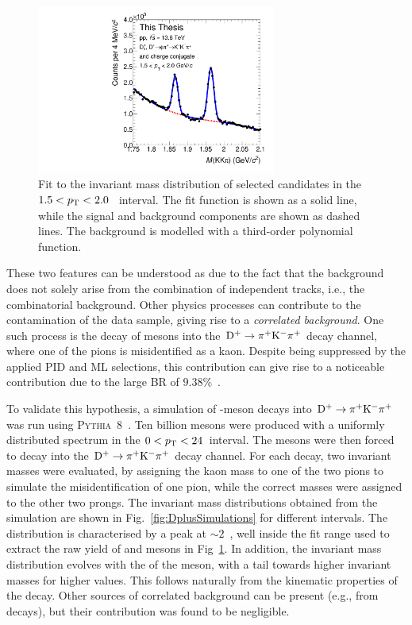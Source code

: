 \begin{figure}[htb]
    \centering
    \includegraphics[width=0.7\textwidth]{Figures/Chapter 5/InvMassFitDs1p5_2.pdf}
    \caption{Fit to the invariant mass distribution of selected candidates in the \mbox{$1.5<p_\mathrm{T}<2.0$~\gevc} interval. The fit function is shown as a solid line, while the signal and background components are shown as dashed lines. The background is modelled with a third-order polynomial function.}
    \label{fig:old_fit}
\end{figure}

These two features can be understood as due to the fact that the background does not solely arise from the combination of independent tracks, i.e., the combinatorial background. Other physics processes can contribute to the contamination of the data sample, giving rise to a \emph{correlated background}. One such process is the decay of \dpl mesons into the $\mathrm{D^+}\rightarrow\mathrm{\pi^+K^-\pi^+}$ decay channel, where one of the pions is misidentified as a kaon. Despite being suppressed by the applied PID and ML selections, this contribution can give rise to a noticeable contribution due to the large BR of $9.38\%$~\cite{pdg}.

\begin{sloppypar}
To validate this hypothesis, a simulation of \dpl-meson decays into \mbox{$\mathrm{D^+}\rightarrow\mathrm{\pi^+K^-\pi^+}$} was run using \textsc{Pythia}~8~\cite{Bierlich:2022pfr}. Ten billion \dpl mesons were produced with a uniformly distributed \pt spectrum in the $0<p_\mathrm{T}<24$~\gevc interval. The \dpl mesons were then forced to decay into the $\mathrm{D^+}\rightarrow\mathrm{\pi^+K^-\pi^+}$ decay channel. For each decay, two invariant masses were evaluated, by assigning the kaon mass to one of the two pions to simulate the misidentification of one pion, while the correct masses were assigned to the other two prongs. The invariant mass distributions obtained from the simulation are shown in Fig.~\ref{fig:DplusSimulations} for different \pt intervals. The distribution is characterised by a peak at $\sim 2$~\gevcc, well inside the fit range used to extract the raw yield of \ds and \dpl mesons in Fig~\ref{fig:old_fit}. In addition, the invariant mass distribution evolves with the \pt of the \dpl meson, with a tail towards higher invariant masses for higher \pt values. This follows naturally from the kinematic properties of the decay. Other sources of correlated background can be present (e.g., from \lc decays), but their contribution was found to be negligible.
\end{sloppypar}

